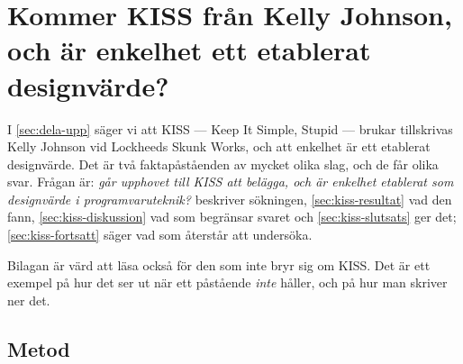 

\chapter[Kommer KISS från Kelly Johnson, och är enkelhet ett etablerat
  designvärde?][Kommer KISS från Kelly Johnson?]{Kommer KISS från Kelly
  Johnson, och är enkelhet ett etablerat designvärde?}
\label{app:kiss}

I \cref{sec:dela-upp} säger vi att KISS ---
\foreignlanguage{english}{Keep It Simple, Stupid} --- brukar tillskrivas
Kelly Johnson vid Lockheeds Skunk Works, och att enkelhet är ett etablerat
designvärde.  Det är två faktapåståenden av mycket olika slag, och de får
olika svar.  Frågan är: \emph{går upphovet till KISS att belägga, och är
enkelhet etablerat som designvärde i programvaruteknik?}
 beskriver sökningen, \cref{sec:kiss-resultat} vad den
fann, \cref{sec:kiss-diskussion} vad som begränsar svaret och
\cref{sec:kiss-slutsats} ger det; \cref{sec:kiss-fortsatt} säger vad
som återstår att undersöka.

Bilagan är värd att läsa också för den som inte bryr sig om KISS.  Det är
ett exempel på hur det ser ut när ett påstående \emph{inte} håller, och på
hur man skriver ner det.

\section{Metod}
\label{sec:kiss-metod}


